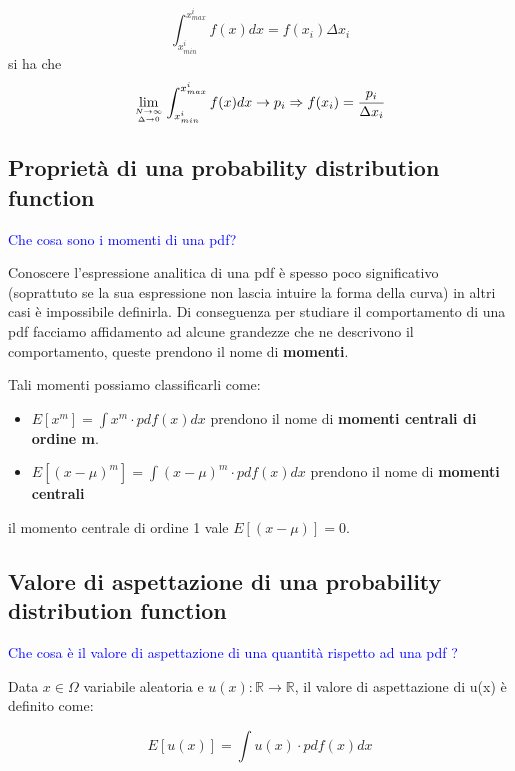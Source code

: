 \begin{equation*}
	\int_{x_{min}^i}^{x_{max}^i}f(x) dx = f(x_i)\Delta x_i
\end{equation*}
si ha che 
\begin{equation*}
	\lim_{N \rightarrow \infty \atop \Delta \rightarrow 0} \int_{x_{min}^i}^{x_{max}^i}f(x) dx \rightarrow p_i \Rightarrow f(x_i) =  \dfrac{p_i}{\Delta x_i}
\end{equation*}

\subsection{Propriet\`{a} di una probability distribution function}
\textcolor{blue}{Che cosa sono i momenti di una pdf?}\newline

Conoscere l'espressione analitica di una pdf \`{e} spesso poco significativo (soprattuto se la sua espressione non lascia intuire la forma della curva) in altri casi \`{e} impossibile definirla. Di conseguenza per studiare il comportamento di una pdf facciamo affidamento ad alcune grandezze che ne descrivono il comportamento, queste prendono il nome di \textbf{momenti}.

Tali momenti possiamo classificarli come:

\begin{itemize}
	\item $E[x^m] = \int{x^m\cdot pdf(x)dx}$ prendono il nome di \textbf{momenti centrali di ordine m}.
	\item $E[(x-\mu)^m] = \int{(x-\mu)^m \cdot pdf(x)dx}$ prendono il nome di \textbf{momenti centrali}
\end{itemize}

il momento centrale di ordine 1 vale $E[(x-\mu)] = 0$.
\subsection{Valore di aspettazione di una probability distribution function}

\textcolor{blue}{Che cosa \`{e} il valore di aspettazione di una quantit\`{a} rispetto ad una pdf ?}

Data $x \in  \Omega $ variabile aleatoria e $u(x): \mathbb{R} \rightarrow \mathbb{R}$, il valore di aspettazione di u(x) \`{e} definito come:

\begin{equation}
	E[u(x)] = \int{u(x)\cdot pdf(x)dx}
\end{equation}

